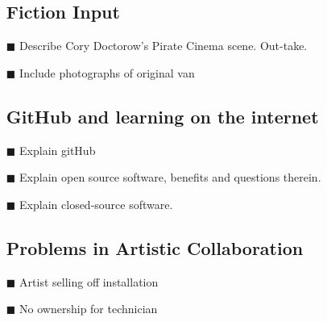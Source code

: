 \begin{itemize}
\subsection{Fiction Input}
\item[\tiny{$\blacksquare$}] Describe Cory Doctorow's Pirate Cinema scene. Out-take.
\item[\tiny{$\blacksquare$}] Include photographs of original van

\subsection{GitHub and learning on the internet}
\item[\tiny{$\blacksquare$}] Explain gitHub
\item[\tiny{$\blacksquare$}] Explain open source software, benefits and questions therein.
\item[\tiny{$\blacksquare$}] Explain closed-source software.

\subsection{Problems in Artistic Collaboration}
\item[\tiny{$\blacksquare$}] Artist selling off installation
\item[\tiny{$\blacksquare$}] No ownership for technician
\end{itemize}
